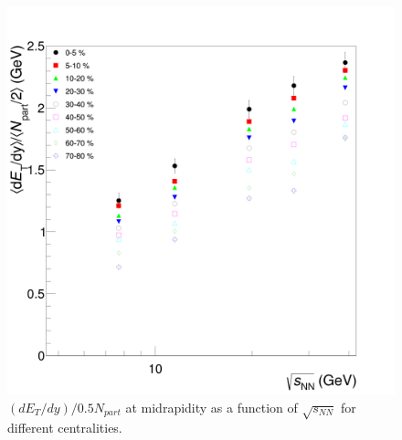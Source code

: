 	\begin{figure}[h]
	  \centering
	  \includegraphics[width=5.5in]{figures/finalStacked/dETdyOverNpartBy2SumCent8s.png}
	  \caption{$(dE_{T}/dy)/0.5N_{part}$ at midrapidity as a function of $\sqrt{s_{NN}}$ for different centralities.}\label{fig:dETdyOverNpartBy2SumCents}
	\end{figure}
	
